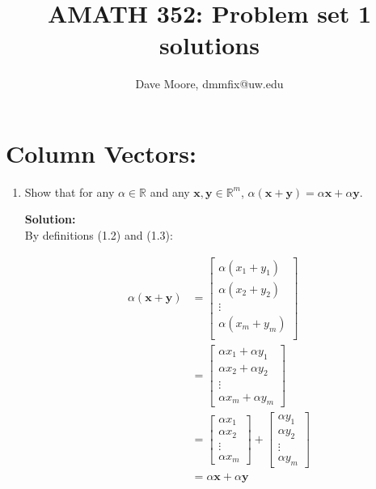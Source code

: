 \documentclass[]{article}
\title{AMATH 352: Problem set 1 solutions}
\author{Dave Moore, dmmfix@uw.edu}
\newcommand{\R}{\mathbb{R}}
\newcommand{\solution}{\vskip 0.5cm \textbf{\large Solution:} \\}
\begin{document}
\maketitle

\section*{Column Vectors:}

\begin{enumerate}
  
\item Show that for any $\alpha\in\R$ and any $\bm{x},\bm{y}\in\mathbb{R}^m$, $\alpha(\bm{x}+\bm{y}) = \alpha\bm{x} + \alpha\bm{y}$.
  
  \solution
  By definitions (1.2) and (1.3):

  \[
    \begin{split}
       \alpha (\bm{x} + \bm{y}) & =
      \begin{bmatrix}
        \alpha (x_{1} + y_{1}) \\
        \alpha (x_{2} + y_{2}) \\
        \vdots \\
        \alpha (x_{m} + y_{m}) \\
      \end{bmatrix} \\
      &=
      \begin{bmatrix}
        \alpha x_{1}  + \alpha y_{1} \\
        \alpha x_{2}  + \alpha y_{2} \\
        \vdots \\
        \alpha x_{m} + \alpha y_{m}
      \end{bmatrix} \\
      &=
      \begin{bmatrix}
        \alpha x_{1} \\
        \alpha x_{2} \\
        \vdots \\
        \alpha x_{m}
      \end{bmatrix} +
      \begin{bmatrix}
        \alpha y_{1} \\
        \alpha y_{2} \\
        \vdots \\
        \alpha y_{m}
      \end{bmatrix} \\
      &=
      \alpha\bm{x} + \alpha\bm{y}
    \end{split}
  \]  
  

\end{enumerate}
\end{document}
